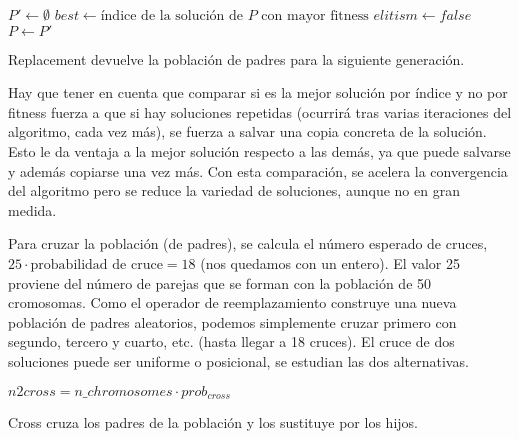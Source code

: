 \documentclass{article}
\begin{document}
\begin{algorithm}[H]
	\DontPrintSemicolon %
	$P'\gets\emptyset$\;
	$best\gets\text{índice de la solución de $P$ con mayor fitness}$\;
	$elitism\gets false$ 
	$P\gets P'$\;
	\caption{{\sc Replacement} devuelve la población de padres para la siguiente generación.}
	\label{alg:replacement-agg}
\end{algorithm}

Hay que tener en cuenta que comparar si es la mejor solución por índice y no por fitness fuerza a que si hay soluciones repetidas
(ocurrirá tras varias iteraciones del algoritmo, cada vez más), se fuerza a salvar una copia concreta de la solución. Esto le da ventaja
a la mejor solución respecto a las demás, ya que puede salvarse y además copiarse una vez más.
Con esta comparación, se acelera la convergencia del algoritmo pero se reduce la variedad de soluciones, aunque
no en gran medida.

Para cruzar la población (de padres), se calcula el número esperado de cruces, $25\cdot\text{probabilidad de cruce}=18$ (nos quedamos
con un entero). El valor 25 proviene del número de parejas que se forman con la población de 50 cromosomas. Como el operador de
reemplazamiento construye una nueva población de padres aleatorios, podemos simplemente cruzar primero con segundo, tercero y cuarto, etc. (hasta llegar a 18 cruces).
El cruce de dos soluciones puede ser uniforme o posicional, se estudian las dos alternativas.

\begin{algorithm}[H]
	\DontPrintSemicolon %
	$n2cross=n\_chromosomes\cdot prob_{cross}$ 
	\caption{{\sc Cross} cruza los padres de la población y los sustituye por los hijos.}
	\label{alg:cross-generational}
\end{algorithm}
\end{document}
